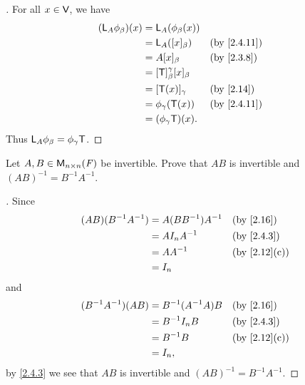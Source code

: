 \begin{proof}[]
  For all \(x \in \mathsf{V}\), we have
  \begin{align*}
    (\L_A \phi_{\beta})(x) & = \L_A(\phi_{\beta}(x))                              \\
                           & = \L_A([x]_{\beta})                 &  & \by{2.4.11} \\
                           & = A [x]_{\beta}                     &  & \by{2.3.8}  \\
                           & = [\T]_{\beta}^{\gamma} [x]_{\beta}                  \\
                           & = [\T(x)]_{\gamma}                  &  & \by{2.14}   \\
                           & = \phi_{\gamma}(\T(x))              &  & \by{2.4.11} \\
                           & = (\phi_{\gamma} \T)(x).
  \end{align*}
  Thus \(\mathsf{L}_A \phi_{\beta} = \phi_{\gamma} \mathsf{T}\).
\end{proof}

\exercisesection

\setcounter{ex}{3}
\begin{ex}\label{ex:2.4.4}
  Let \(A, B \in \ms[n][n][\F]\) be invertible.
  Prove that \(AB\) is invertible and \((AB)^{-1} = B^{-1} A^{-1}\).
\end{ex}

\begin{proof}[]
  Since
  \begin{align*}
    (AB) (B^{-1} A^{-1}) & = A (B B^{-1}) A^{-1} &  & \by{2.16}    \\
                         & = A I_n A^{-1}        &  & \by{2.4.3}   \\
                         & = A A^{-1}            &  & \by{2.12}[c] \\
                         & = I_n
  \end{align*}
  and
  \begin{align*}
    (B^{-1} A^{-1}) (AB) & = B^{-1} (A^{-1} A) B &  & \by{2.16}    \\
                         & = B^{-1} I_n B        &  & \by{2.4.3}   \\
                         & = B^{-1} B            &  & \by{2.12}[c] \\
                         & = I_n,
  \end{align*}
  by \cref{2.4.3} we see that \(AB\) is invertible and \((AB)^{-1} = B^{-1} A^{-1}\).
\end{proof}

